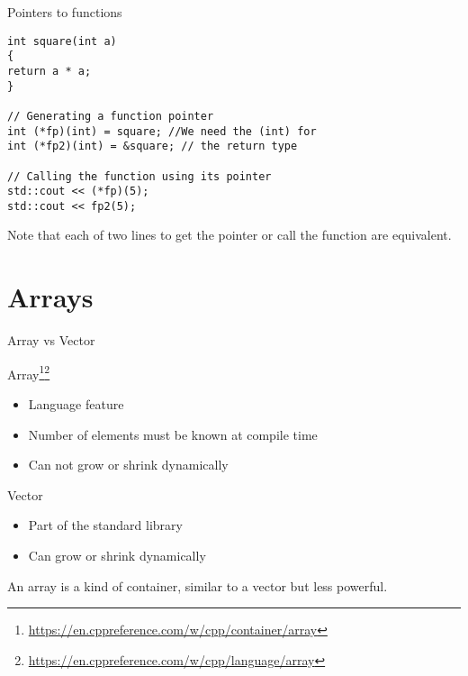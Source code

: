 \documentclass[12pt,t]{beamer}
\begin{document}
\begin{frame}[fragile]{Pointers to functions}

\begin{lstlisting}
int square(int a)
{
return a * a;
}

// Generating a function pointer
int (*fp)(int) = square; //We need the (int) for
int (*fp2)(int) = &square; // the return type

// Calling the function using its pointer
std::cout << (*fp)(5);
std::cout << fp2(5);

\end{lstlisting}
Note that each of two lines to get the pointer or call the function are equivalent. 

\end{frame}

\section{Arrays}

\begin{frame}{Array vs Vector}


\begin{block}{Array\footnote{\tiny\url{https://en.cppreference.com/w/cpp/container/array}}\footnote{\tiny\url{https://en.cppreference.com/w/cpp/language/array}}}
\begin{itemize}
\item Language feature
\item Number of elements must be known at compile time
\item Can not grow or shrink dynamically
\end{itemize}
\end{block}

\begin{block}{Vector}
\begin{itemize}
\item Part of the standard library
\item Can grow or shrink dynamically
\end{itemize}
\end{block}
An array is a kind of container, similar to a vector but less powerful.
\end{frame}
\end{document}
